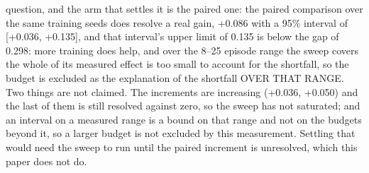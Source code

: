 \documentclass[conference]{IEEEtran}
\begin{document}
question, and the arm that settles it is the paired one: the paired comparison over the same training seeds does resolve a real gain, +0.086 with a 95\% interval of [+0.036, +0.135], and that interval's upper limit of 0.135 is below the gap of 0.298: more training does help, and over the 8--25 episode range the sweep covers the whole of its measured effect is too small to account for the shortfall, so the budget is excluded as the explanation of the shortfall OVER THAT RANGE.  Two things are not claimed.  The increments are increasing (+0.036, +0.050) and the last of them is still resolved against zero, so the sweep has not saturated; and an interval on a measured range is a bound on that range and not on the budgets beyond it, so a larger budget is not excluded by this measurement.  Settling that would need the sweep to run until the paired increment is unresolved, which this paper does not do.
\end{document}
